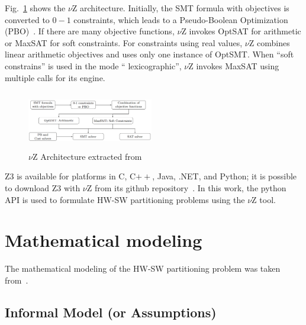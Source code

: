 Fig.~\ref{vZ-Architecture} shows the $\nu$Z architecture. Initially, the SMT formula with objectives is converted to $0-1$ constraints, which leads to a Pseudo-Boolean Optimization (PBO)~\cite{Barth1995,Vasco2005}. If there are many objective functions, $\nu$Z invokes OptSAT for arithmetic or MaxSAT for soft constraints. For constraints using real values, $\nu$Z combines linear arithmetic objectives and uses only one instance of OptSMT. When ``soft constrains'' is used in the mode `` lexicographic'', $\nu$Z invokes MaxSAT using multiple calls for its engine.
%
\begin{figure}[ht]
	\centering
  \includegraphics[width=0.49\textwidth, height=95px]{Image/vzArch.png} 
	\caption{$\nu$Z Architecture extracted from~\cite{Bjorner2015}}
	\label{vZ-Architecture}
\end{figure}

Z3 is available for platforms in C, C$++$, Java, .NET, and Python; it is possible to download Z3 with $\nu$Z from its github repository~\cite{Z3API}. In this work, the python API is used to formulate HW-SW partitioning problems using the $\nu$Z tool. 

\section{Mathematical modeling}
\label{Mathematical-modeling}

The mathematical modeling of the HW-SW partitioning problem was taken from~\cite{Arato2003,Mann2007}.

\subsection{Informal Model (or Assumptions)}
\label{Informal-Model-or-Assumptions}

